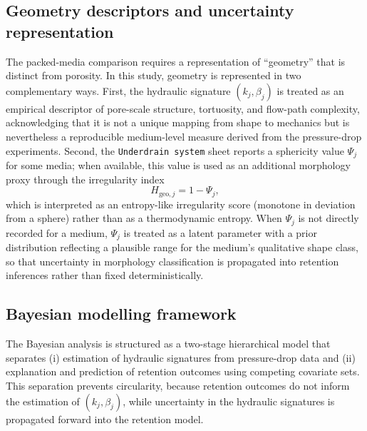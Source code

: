 \documentclass[11pt]{article}
\begin{document}
\subsection{Geometry descriptors and uncertainty representation}
The packed-media comparison requires a representation of ``geometry'' that is distinct from porosity. In this study, geometry is represented in two complementary ways. First, the hydraulic signature $(k_j,\beta_j)$ is treated as an empirical descriptor of pore-scale structure, tortuosity, and flow-path complexity, acknowledging that it is not a unique mapping from shape to mechanics but is nevertheless a reproducible medium-level measure derived from the pressure-drop experiments. Second, the \texttt{Underdrain system} sheet reports a sphericity value $\Psi_j$ for some media; when available, this value is used as an additional morphology proxy through the irregularity index
\begin{equation}
H_{\mathrm{geo},j} = 1-\Psi_j,
\end{equation}
which is interpreted as an entropy-like irregularity score (monotone in deviation from a sphere) rather than as a thermodynamic entropy. When $\Psi_j$ is not directly recorded for a medium, $\Psi_j$ is treated as a latent parameter with a prior distribution reflecting a plausible range for the medium's qualitative shape class, so that uncertainty in morphology classification is propagated into retention inferences rather than fixed deterministically.

\subsection{Bayesian modelling framework}
The Bayesian analysis is structured as a two-stage hierarchical model that separates (i) estimation of hydraulic signatures from pressure-drop data and (ii) explanation and prediction of retention outcomes using competing covariate sets. This separation prevents circularity, because retention outcomes do not inform the estimation of $(k_j,\beta_j)$, while uncertainty in the hydraulic signatures is propagated forward into the retention model.
\end{document}
